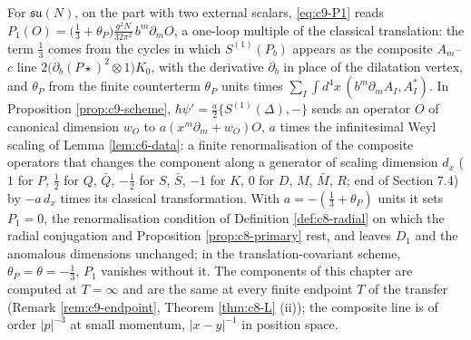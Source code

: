 \begin{remark}
For $\mathfrak{su}(N)$, on the part with two external scalars, \eqref{eq:c9-P1} reads $P_1(O)=\big(\tfrac13+\theta_P\big)\frac{g^2N}{32\pi^2}\,b^m\partial_mO$, a one-loop multiple of the classical translation: the term $\tfrac13$ comes from the cycles in which $S^{(1)}(P_b)$ appears as the composite $A_m$--$c$ line $2\big(\partial_b(P\star)^2\otimes1\big)K_0$, with the derivative $\partial_b$ in place of the dilatation vertex, and $\theta_P$ from the finite counterterm $\theta_P$ units times $\sum_I\int d^4x\,(b^m\partial_mA_I,A^*_I)$. In Proposition \ref{prop:c9-scheme}, $\hbar\psi'=\tfrac a2\{S^{(1)}(\Delta),-\}$ sends an operator $O$ of canonical dimension $w_O$ to $a(x^m\partial_m+w_O)O$, $a$ times the infinitesimal Weyl scaling of Lemma \ref{lem:c6-data}: a finite renormalisation of the composite operators that changes the component along a generator of scaling dimension $d_x$ ($1$ for $P$, $\tfrac12$ for $Q$, $\bar Q$, $-\tfrac12$ for $S$, $\bar S$, $-1$ for $K$, $0$ for $D$, $M$, $\bar M$, $R$; end of Section 7.4) by $-a\,d_x$ times its classical transformation. With $a=-(\tfrac13+\theta_P)$ units it sets $P_1=0$, the renormalisation condition of Definition \ref{def:c8-radial} on which the radial conjugation and Proposition \ref{prop:c8-primary} rest, and leaves $D_1$ and the anomalous dimensions unchanged; in the translation-covariant scheme, $\theta_P=\theta=-\tfrac13$, $P_1$ vanishes without it. The components of this chapter are computed at $T=\infty$ and are the same at every finite endpoint $T$ of the transfer (Remark \ref{rem:c9-endpoint}, Theorem \ref{thm:c8-L} (ii)); the composite line is of order $|p|^{-3}$ at small momentum, $|x-y|^{-1}$ in position space.
\end{remark}
